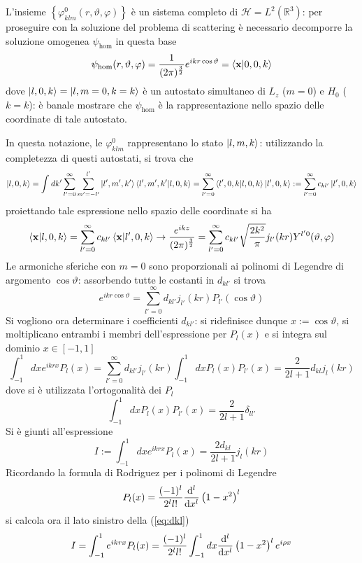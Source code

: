 
L'insieme $\left\{\varphi^0_{klm}(r,\vartheta,\varphi)\right\}$ è un sistema completo di
$\mathcal{H}=L^2(\mathbb{R}^3)$: per proseguire con la soluzione del problema di scattering è
necessario decomporre la soluzione omogenea $\psi_\text{hom}$ in questa base
$$\psi_\text{hom}(r,\vartheta,\varphi) = \frac{1}{(2\pi)^{\frac32}} e^{ikr\cos\vartheta} = 
\bra{\mathbf{x}}\ket{0,0,k}$$
dove $\ket{l,0,k} = \ket{l,m=0,k=k}$ è un autostato simultaneo di $L_z$ ($m=0$) e
$H_0$ ($k=k$): è banale mostrare che $\psi_\text{hom}$ è la rappresentazione nello spazio delle
coordinate di tale autostato. 

In questa notazione, le $\varphi^0_{klm}$ rappresentano lo stato $\ket{l,m,k}$: utilizzando la
completezza di questi autostati, si trova che
$$\ket{l,0,k}=\int_{}^{}dk'\sum_{l'=0}^{\infty}\sum_{m'=-l'}^{l'}\ket{l',m',k'}\bra{l',m',k'}
\ket{l,0,k} =\sum_{l'=0}^{\infty}\bra{l',0,k}\ket{l,0,k}\ket{l',0,k}
:=\sum_{l'=0}^{\infty}c_{kl'}\ket{l',0,k}$$
proiettando tale espressione nello spazio delle coordinate si ha
$$\bra{\mathbf{x}}\ket{l,0,k} = \sum_{l'=0}^{\infty}c_{kl'}\bra{\mathbf{x}}\ket{l',0,k} \rightarrow
\frac{e^{ikz}}{(2\pi)^\frac32}= \sum_{l'=0}^{\infty}c_{kl'}\sqrt{\frac{2k^2}{\pi}}j_{l'}(kr)
Y^{l'0}(\vartheta,\varphi)
$$
Le armoniche sferiche con $m=0$ sono proporzionali ai polinomi di Legendre di argomento
$\cos\vartheta$: assorbendo tutte le costanti in $d_{kl'}$ si trova
$$e^{ikr\cos\vartheta}=\sum_{l'=0}^{\infty}d_{kl'}j_{l'}(kr)P_{l'}(\cos\vartheta)$$
Si vogliono ora determinare i coefficienti $d_{kl'}$: si ridefinisce dunque $x:=\cos\vartheta$,
si moltiplicano entrambi i membri dell'espressione per $P_l(x)$ e si integra sul dominio
$x\in[-1,1]$
$$\int_{-1}^{1}dxe^{ikrx}P_l(x) = \sum_{l'=0}^{\infty}d_{kl'}j_{l'}(kr)\int_{-1}^{1}dxP_l(x)P_{l'}(x)
=\frac{2}{2l+1}d_{kl}j_l(kr)
$$
dove si è utilizzata l'ortogonalità dei $P_l$
$$\int_{-1}^{1}dxP_l(x)P_{l'}(x)=\frac{2}{2l+1}\delta_{ll'}$$
Si è giunti all'espressione
\begin{equation}
    I:=\int_{-1}^{1}dxe^{ikrx}P_l(x) = \frac{2d_{kl}}{2l+1}j_l(kr)
    \label{eq:dkl}
\end{equation}
Ricordando la formula di Rodriguez per i polinomi di Legendre
$$P_l(x) = \frac{(-1)^l}{2^ll!} \dv[l]{}{x}\left(1-x^2\right)^l$$
si calcola ora il lato sinistro della (\ref{eq:dkl})
$$I = \int_{-1}^{1}e^{ikrx}P_l(x) = 
\frac{(-1)^l}{2^ll!}\int_{-1}^{1}dx \dv[l]{}{x} \left(1-x^2\right)^le^{i\rho x}
$$
